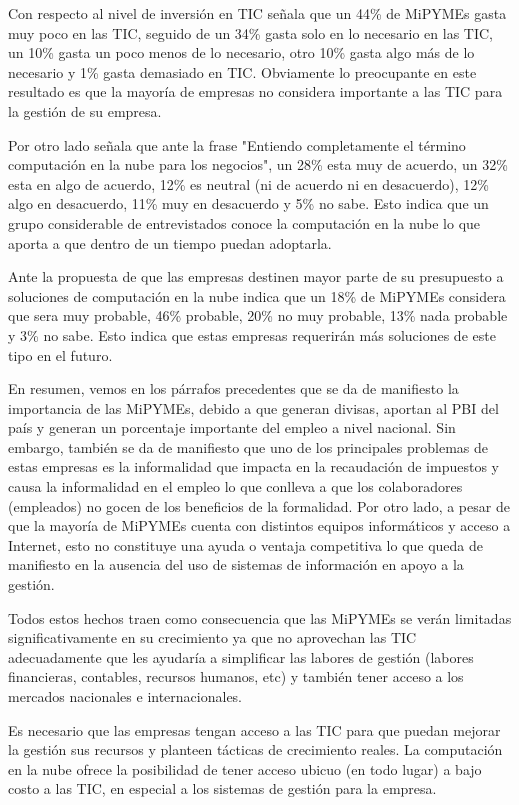 Con respecto al nivel de inversión en TIC \cite{ipsos} señala que un 44\% de MiPYMEs
gasta muy poco en las TIC, seguido de un 34\% gasta solo en lo necesario en las TIC,
un 10\% gasta un poco menos de lo necesario, otro 10\% gasta algo más de lo necesario y
1\% gasta demasiado en TIC. Obviamente lo preocupante en este resultado es que la
mayoría de empresas no considera importante a las TIC para la gestión de su empresa.

Por otro lado \cite{ipsos} señala que ante la frase "Entiendo completamente el
término computación en la nube para los negocios", un 28\% esta muy de acuerdo, un 32\%
esta en algo de acuerdo, 12\% es neutral (ni de acuerdo ni en desacuerdo), 12\%
algo en desacuerdo, 11\% muy en desacuerdo y 5\% no sabe. Esto indica que un grupo
considerable de entrevistados conoce la computación en la nube lo que aporta a que
dentro de un tiempo puedan adoptarla.

Ante la propuesta de que las empresas destinen mayor parte de su presupuesto a
soluciones de computación en la nube \cite{ipsos} indica que un 18\% de MiPYMEs
considera que sera muy probable, 46\% probable, 20\% no muy probable, 13\% nada
probable y 3\% no sabe. Esto indica que estas empresas requerirán más soluciones
de este tipo en el futuro.

En resumen, vemos en los párrafos precedentes que se da de manifiesto la importancia
de las MiPYMEs, debido a que generan divisas, aportan al PBI del país y generan
un porcentaje importante del empleo a nivel nacional. Sin embargo, también se da
de manifiesto que uno de los principales problemas de estas empresas es la informalidad
que impacta en la recaudación de impuestos y causa la informalidad en el empleo
lo que conlleva a que los colaboradores (empleados) no gocen de los beneficios de la formalidad.
Por otro lado, a pesar de que la mayoría de MiPYMEs cuenta con distintos equipos
informáticos y acceso a Internet, esto no constituye una ayuda o ventaja competitiva
lo que queda de manifiesto en la ausencia del uso de sistemas de información en
apoyo a la gestión.

Todos estos hechos traen como consecuencia que las MiPYMEs se verán limitadas
significativamente en su crecimiento ya que no aprovechan las TIC adecuadamente
que les ayudaría a simplificar las labores de gestión (labores financieras, contables,
recursos humanos, etc) y también tener acceso a los mercados nacionales e internacionales.

Es necesario que las empresas tengan acceso a las TIC para que puedan mejorar la
gestión sus recursos y planteen tácticas de crecimiento reales. La computación
en la nube ofrece la posibilidad de tener acceso ubicuo (en todo lugar) a bajo
costo a las TIC, en especial a los sistemas de gestión para la empresa.

